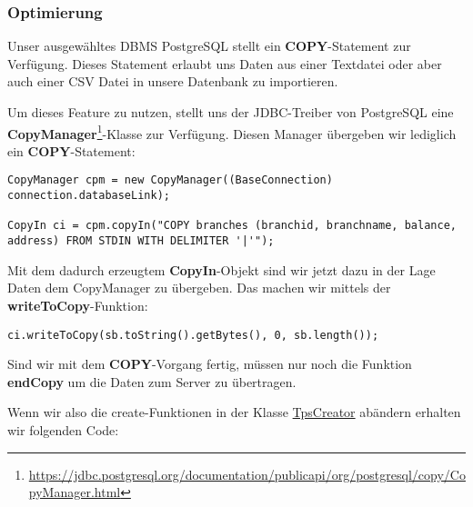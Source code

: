 \subsubsection*{Optimierung}
Unser ausgewähltes DBMS PostgreSQL stellt ein \textbf{COPY}-Statement zur
Verfügung. Dieses Statement erlaubt uns Daten aus einer Textdatei oder aber auch
einer CSV Datei in unsere Datenbank zu importieren. 

Um dieses Feature zu nutzen, stellt uns der JDBC-Treiber von PostgreSQL eine
\textbf{CopyManager}\footnote{\url{https://jdbc.postgresql.org/documentation/publicapi/org/postgresql/copy/CopyManager.html}}-Klasse
zur Verfügung. Diesen Manager übergeben wir lediglich ein
\textbf{COPY}-Statement:

\begin{lstlisting}[caption={Initialisierung des CopyManagers},numbers=none]
CopyManager cpm = new CopyManager((BaseConnection) connection.databaseLink);

CopyIn ci = cpm.copyIn("COPY branches (branchid, branchname, balance, address) FROM STDIN WITH DELIMITER '|'");
\end{lstlisting}

Mit dem dadurch erzeugtem \textbf{CopyIn}-Objekt sind wir jetzt dazu in der Lage
Daten dem CopyManager zu übergeben. Das machen wir mittels der
\textbf{writeToCopy}-Funktion:

\begin{lstlisting}[caption={WriteToCopy-Funktion},numbers=none]
ci.writeToCopy(sb.toString().getBytes(), 0, sb.length());
\end{lstlisting}

Sind wir mit dem \textbf{COPY}-Vorgang fertig, müssen nur noch die Funktion
\textbf{endCopy} um die Daten zum Server zu übertragen.

Wenn wir also die create-Funktionen in der Klasse
\hyperref[lst:tpsv2]{TpsCreator} abändern erhalten wir folgenden Code:

